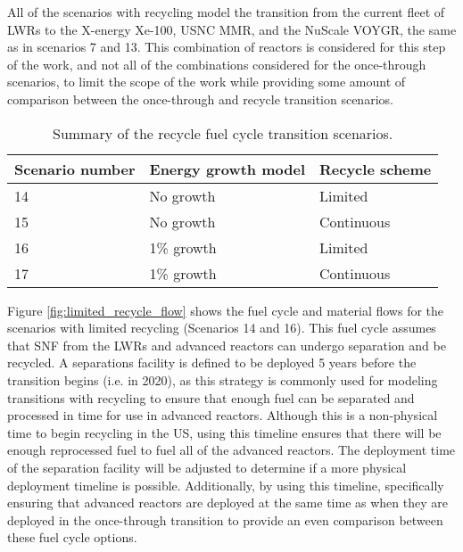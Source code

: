 All of the scenarios with recycling model the transition from the 
current fleet of \glspl{LWR} to the X-energy Xe-100, \gls{USNC} \gls{MMR}, 
and the NuScale VOYGR, the same as in scenarios 7 and 13. This combination 
of reactors is considered for this step of the work, and not all of the 
combinations considered for the once-through scenarios, to limit the scope 
of the work while providing some amount of comparison between the 
once-through and recycle transition scenarios. 

\begin{table}[ht]
    \centering
    \caption{Summary of the recycle fuel cycle transition scenarios.}
    \label{tab:scenarios_recycle}
    \begin{tabular}{l l l}
            \hline
            Scenario number & Energy growth model & Recycle scheme\\\hline
            14 & No growth & Limited \\
            15 & No growth & Continuous \\
            16 & 1\% growth & Limited \\
            17 & 1\% growth & Continuous \\
            \hline
    \end{tabular}
\end{table}

Figure \ref{fig:limited_recycle_flow} shows the fuel cycle and material flows 
for the scenarios with limited recycling (Scenarios 14 and 16). This fuel 
cycle assumes that \gls{SNF}
from the \glspl{LWR} and advanced reactors can undergo separation and be 
recycled. A separations facility is defined to be deployed 5 years before 
the transition 
begins (i.e. in 2020), as this strategy is commonly used for modeling 
transitions with recycling \cite{passerini_systematic_2014,richards_application_2021}
to ensure that enough fuel can be separated and 
processed in time for use in advanced reactors. Although this is a 
non-physical time to begin recycling in the US, using this timeline ensures 
that there will be enough reprocessed fuel to fuel all of the advanced 
reactors. The deployment time of the separation facility will be adjusted 
to determine if a more physical deployment timeline is possible. Additionally, 
by using this timeline, specifically ensuring that advanced reactors 
are deployed at the same time as when they are deployed in the once-through 
transition to provide an even comparison between these fuel cycle options. 



